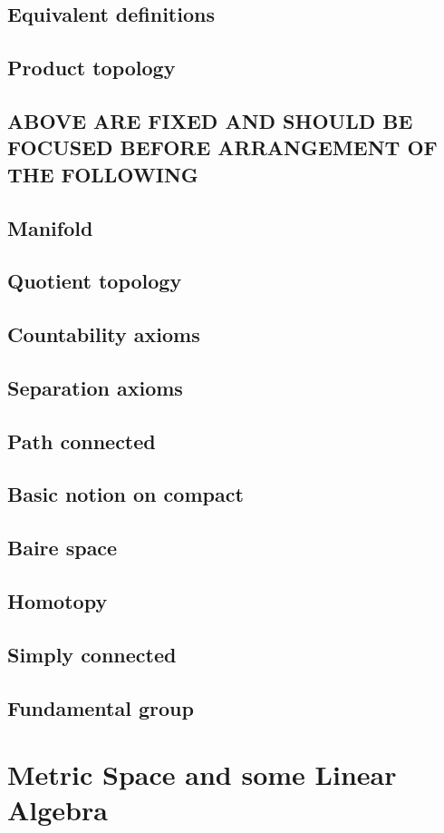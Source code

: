 \documentclass{report}
\begin{document}
\section{Equivalent definitions}
\section{Product topology}
\section{ABOVE ARE FIXED AND SHOULD BE FOCUSED BEFORE ARRANGEMENT OF THE FOLLOWING}
\section{Manifold}
\section{Quotient topology}
\section{Countability axioms}
\section{Separation axioms}
\section{Path connected}
\section{Basic notion on compact}
\section{Baire space}
\section{Homotopy}
\section{Simply connected}
\section{Fundamental group}
\chapter{Metric Space and some Linear Algebra}
\end{document}
